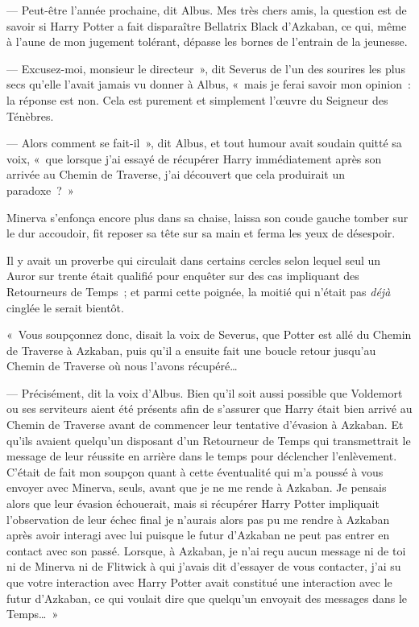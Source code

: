 --- Peut-être l'année prochaine, dit Albus. Mes très chers amis, la question est de savoir si Harry Potter a fait disparaître Bellatrix Black d'Azkaban, ce qui, même à l'aune de mon jugement tolérant, dépasse les bornes de l'entrain de la jeunesse.

--- Excusez-moi, monsieur le directeur~», dit Severus de l'un des sourires les plus secs qu'elle l'avait jamais vu donner à Albus, «~mais je ferai savoir mon opinion~: la réponse est non. Cela est purement et simplement l'œuvre du Seigneur des Ténèbres.

--- Alors comment se fait-il~», dit Albus, et tout humour avait soudain quitté sa voix, «~que lorsque j'ai essayé de récupérer Harry immédiatement après son arrivée au Chemin de Traverse, j'ai découvert que cela produirait un paradoxe~?~»

Minerva s'enfonça encore plus dans sa chaise, laissa son coude gauche tomber sur le dur accoudoir, fit reposer sa tête sur sa main et ferma les yeux de désespoir.

Il y avait un proverbe qui circulait dans certains cercles selon lequel seul un Auror sur trente était qualifié pour enquêter sur des cas impliquant des Retourneurs de Temps~; et parmi cette poignée, la moitié qui n'était pas \emph{déjà} cinglée le serait bientôt.

«~Vous soupçonnez donc, disait la voix de Severus, que Potter est allé du Chemin de Traverse à Azkaban, puis qu'il a ensuite fait une boucle retour jusqu'au Chemin de Traverse où nous l'avons récupéré…

--- Précisément, dit la voix d'Albus. Bien qu'il soit aussi possible que Voldemort ou ses serviteurs aient été présents afin de s'assurer que Harry était bien arrivé au Chemin de Traverse avant de commencer leur tentative d'évasion à Azkaban. Et qu'ils avaient quelqu'un disposant d'un Retourneur de Temps qui transmettrait le message de leur réussite en arrière dans le temps pour déclencher l'enlèvement. C'était de fait mon soupçon quant à cette éventualité qui m'a poussé à vous envoyer avec Minerva, seuls, avant que je ne me rende à Azkaban. Je pensais alors que leur évasion échouerait, mais si récupérer Harry Potter impliquait l'observation de leur échec final je n'aurais alors pas pu me rendre à Azkaban après avoir interagi avec lui puisque le futur d'Azkaban ne peut pas entrer en contact avec son passé. Lorsque, à Azkaban, je n'ai reçu aucun message ni de toi ni de Minerva ni de Flitwick à qui j'avais dit d'essayer de vous contacter, j'ai su que votre interaction avec Harry Potter avait constitué une interaction avec le futur d'Azkaban, ce qui voulait dire que quelqu'un envoyait des messages dans le Temps…~»

